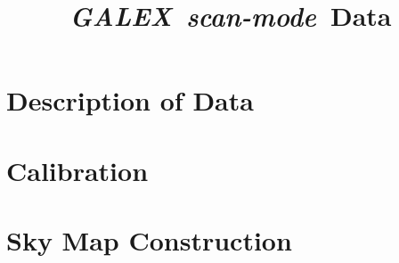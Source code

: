 \documentclass[12pt, preprint]{aastex}
\begin{document}
\newcommand{\project}[1]{\textsl{#1}} 
\newcommand{\galex}{\project{GALEX}}
\newcommand{\scanmode}{\project{scan-mode}}

\title{\galex\ \scanmode\ Data}
\author{}

\section{Description of Data}

\section{Calibration}

\section{Sky Map Construction}
\end{document}
